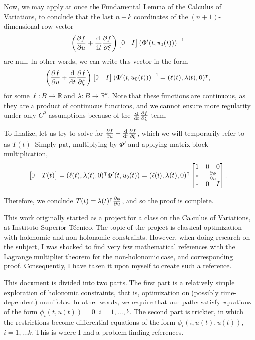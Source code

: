\documentclass{article}
\theoremstyle{plain}
\theoremstyle{plain}
\theoremstyle{nonumberplain}
\theoremstyle{empty}
\newcommand{\R}{\mathbb{R}}
\newcommand{\tr}{\intercal}
\begin{document}
\begin{itemize}
Now, we may apply at once the Fundamental Lemma of the Calculus of Variations, to conclude that the last $n-k$ coordinates of the $(n+1)$-dimensional row-vector
\[\left( \diffp f u + \diff*{\diffp f {\xi}}t \right) \begin{bmatrix} 0 & I \end{bmatrix} \left( \Phi'(t, u_0(t)) \right)^{-1}\]
are null.  In other words, we can write this vector in the form
\[\left( \diffp f u + \diff*{\diffp f {\xi}}t \right) \begin{bmatrix} 0 & I \end{bmatrix} \left( \Phi'(t, u_0(t)) \right)^{-1} = (\ell(t),\lambda(t),0)^\tr,\]
for some $\ell : B \to \R$ and $\lambda : B \to \R^k$. Note that these functions are continuous, as they are a product of continuous functions, and we cannot ensure more regularity under only $C^2$ assumptions because of the $\diff*{\diffp f \xi}t$ term.

To finalize, let us try to solve for $\diffp f u + \diff*{\diffp f {\xi}}t$, which we will temporarily refer to as $T(t)$. Simply put, multiplying by $\Phi'$ and applying matrix block multiplication,
\[\begin{bmatrix}0 & T(t)\end{bmatrix} = (\ell(t), \lambda(t), 0)^\tr \Phi'(t,u_0(t)) =
(\ell(t), \lambda(t), 0)^\tr
\begin{bmatrix}
1 & \begin{matrix} 0 & 0 \end{matrix}\\
* & \diffp\phi u\\
* & \begin{matrix}
0 & I
\end{matrix}
\end{bmatrix}.\]

Therefore, we conclude $T(t) = \lambda(t)^\tr \diffp\phi u$, and so the proof is complete.
\end{itemize}

This work originally started as a project for a class on the Calculus of Variations, at Instituto Superior Técnico. The topic of the project is classical optimization with holonomic and non-holonomic constraints. However, when doing research on the subject, I was shocked to find very few mathematical references with the Lagrange multiplier theorem for the non-holonomic case, and corresponding proof. Consequently, I have taken it upon myself to create such a reference.

This document is divided into two parts. The first part is a relatively simple exploration of holonomic constraints, that is, optimization on (possibly time-dependent) manifolds. In other words, we require that our paths satisfy equations of the form $\phi_i(t, u(t)) = 0$, $i = 1, \dots, k$. The second part is trickier, in which the restrictions become differential equations of the form $\phi_i(t,u(t), \dot u(t))$, $i = 1, \dots k$. This is where I had a problem finding references.
\end{document}
